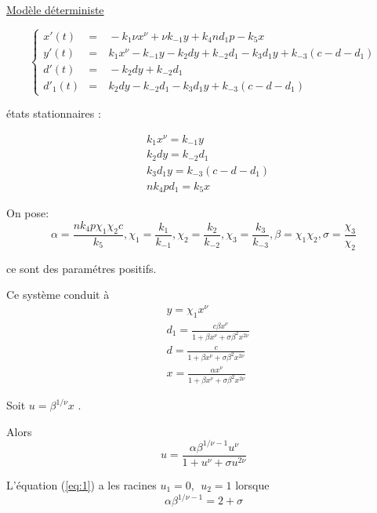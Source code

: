 \documentclass{article}
\begin{document}
\underline{Mod{\`e}le d{\'e}terministe}


\[
  \left \{
 \begin{array}{lll}
x'(t) & = & \ -k_1 \nu x^{\nu} +\nu k_{-1}y+k_4nd_1p-k_5x \\
y'(t) & = & \ k_1x^{\nu}-k_{-1}y-k_2dy+k_{-2}d_1-k_3d_1y+k_{-3}(c-d-d_1)\\
d'(t) & = & \ -k_2dy+k_{-2}d_1 \\
d'_1(t) & = & \ k_2dy-k_{-2}d_1-k_3d_1y+k_{-3}(c-d-d_1)
\end{array} \right.
\]

{\'e}tats stationnaires :


\begin{eqnarray}
& k_1 x^{\nu}=k_{-1}y \label{eq:B1} \\
& k_2 dy=k_{-2}d_1 \label{eq:B2} \\
& k_3d_1y= k_{-3}(c-d-d_1) \label{eq:B3} \\
& nk_4pd_1=k_5x \label{eq:B4}
\end{eqnarray}

On pose:
\[
\alpha=\frac{nk_4p\chi_1 \chi_2 c}{k_5} , \chi_1=\frac{k_1}{k_{-1}}
,\chi_2=\frac{k_2}{k_{-2}}, \chi_3=\frac{k_3}{k_{-3}} , \beta=\chi_1\chi_2 , \sigma=\frac{\chi_3}{\chi_2}
\]

ce sont des param{\'e}tres positifs.

Ce syst{\`e}me conduit {\`a}
\begin{equation}\label{eq:B6}
\begin{split}
& y=\chi_1 x^{\nu} \\
& d_1=\frac{c\beta x^{\nu}}{1+\beta x^{\nu}+\sigma\beta^2 x^{2\nu}} \\
& d=\frac{c}{1+\beta x^{\nu}+\sigma \beta^2x^{2\nu}} \\
& x=\frac{\alpha x^{\nu}}{1+\beta x^{\nu}+\sigma \beta^2x^{2\nu}}
\end{split}
\end{equation}

Soit $u=\beta^{1/\nu}x$ .

Alors
\begin{equation}
\label{eq:1}
u=\frac{\alpha \beta^{1/\nu-1}u^{\nu}}{1+u^{\nu}+\sigma u^{2\nu}}
\end{equation}

L'{\'e}quation (\ref{eq:1}) a les racines $u_1=0, ~~u_2=1$ lorsque
\begin{equation}
\label{eq:2}
\alpha \beta^{1/\nu-1}=2+\sigma
\end{equation}
\end{document}
